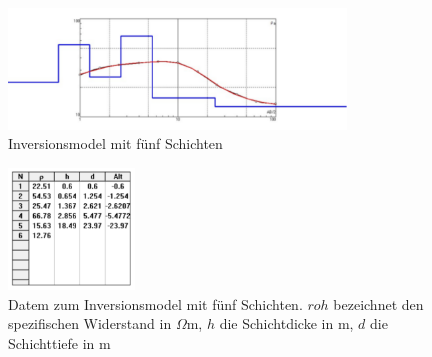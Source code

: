 \begin{figure}[h]
\centering
\includegraphics[width=0.8\textwidth]{fig/Schlumberger_5Schichten.pdf}
\caption{Inversionsmodel mit fünf Schichten}
\label{abb:Schlum2}
\end{figure}
\begin{figure}[h]
\centering
\includegraphics[width=0.3\textwidth]{fig/schlumbergerTabelle2.pdf}
\caption{Datem zum Inversionsmodel mit fünf Schichten. $roh$ bezeichnet den spezifischen Widerstand in $\Omega$m, $h$ die Schichtdicke in m, $d$ die Schichttiefe in m}
\label{abb:SchlumTab2}
\end{figure}





